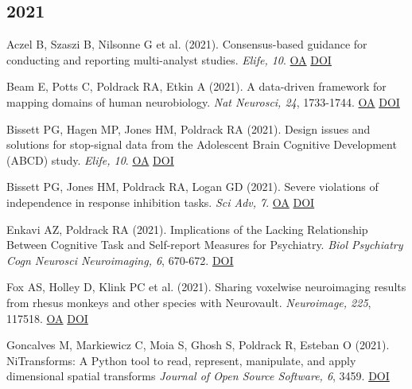 \documentclass[10pt, letterpaper]{article}
\begin{document}
\subsection*{2021}Aczel B, Szaszi B, Nilsonne G et al. (2021). Consensus-based guidance for conducting and reporting multi-analyst studies. \textit{Elife, 10}. \href{https://www.ncbi.nlm.nih.gov/pmc/articles/PMC8626083}{OA} \href{http://dx.doi.org/10.7554/elife.72185}{DOI} \vspace{2mm}

Beam E, Potts C, Poldrack RA, Etkin A (2021). A data-driven framework for mapping domains of human neurobiology. \textit{Nat Neurosci, 24}, 1733-1744. \href{https://www.ncbi.nlm.nih.gov/pmc/articles/PMC8761068}{OA} \href{http://dx.doi.org/10.1038/s41593-021-00948-9}{DOI} \vspace{2mm}

Bissett PG, Hagen MP, Jones HM, Poldrack RA (2021). Design issues and solutions for stop-signal data from the Adolescent Brain Cognitive Development (ABCD) study. \textit{Elife, 10}. \href{https://www.ncbi.nlm.nih.gov/pmc/articles/PMC7997655}{OA} \href{http://dx.doi.org/10.7554/elife.60185}{DOI} \vspace{2mm}

Bissett PG, Jones HM, Poldrack RA, Logan GD (2021). Severe violations of independence in response inhibition tasks. \textit{Sci Adv, 7}. \href{https://www.ncbi.nlm.nih.gov/pmc/articles/PMC7968836}{OA} \href{http://dx.doi.org/10.1126/sciadv.abf4355}{DOI} \vspace{2mm}

Enkavi AZ, Poldrack RA (2021). Implications of the Lacking Relationship Between Cognitive Task and Self-report Measures for Psychiatry. \textit{Biol Psychiatry Cogn Neurosci Neuroimaging, 6}, 670-672. \href{http://dx.doi.org/10.1016/j.bpsc.2020.06.010}{DOI} \vspace{2mm}

Fox AS, Holley D, Klink PC et al. (2021). Sharing voxelwise neuroimaging results from rhesus monkeys and other species with Neurovault. \textit{Neuroimage, 225}, 117518. \href{https://www.ncbi.nlm.nih.gov/pmc/articles/PMC7846271}{OA} \href{http://dx.doi.org/10.1016/j.neuroimage.2020.117518}{DOI} \vspace{2mm}

Goncalves M, Markiewicz C, Moia S, Ghosh S, Poldrack R, Esteban O (2021). NiTransforms: A Python tool to read, represent, manipulate, and apply dimensional spatial transforms \textit{Journal of Open Source Software, 6}, 3459. \href{http://dx.doi.org/10.21105/joss.03459}{DOI} \vspace{2mm}
\end{document}
